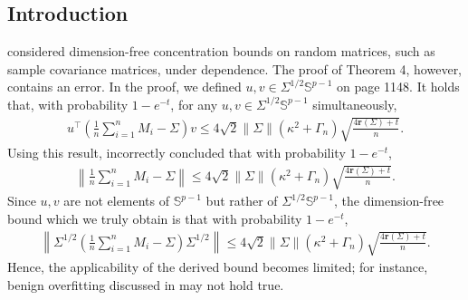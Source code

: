 \documentclass[11pt,a4paper]{article}
\theoremstyle{remark}
\theoremstyle{definition}
\newcommand{\bSigma}{\Sigma}
\newcommand{\bbS}{\mathbb{S}}
\newcommand{\er}{\mathbf{r}}
\theoremstyle{definition}
\begin{document}
\begin{bibunit}[apalike]

\begin{abstract}
We correct Theorem 4 of \citet{nakakita2024dimension} by introducing a log-Sobolev inequality in place of the the boundedness condition.
We show that the examples discussed in \citet{nakakita2024dimension} can be recovered under new conditions.
The original, uncorrected version---which includes the aforementioned error---is appended after this corrigendum for transparency and comparison.
\end{abstract}

\section{Introduction}
\citet{nakakita2024dimension} considered dimension-free concentration bounds on random matrices, such as sample covariance matrices, under dependence.
The proof of Theorem 4, however, contains an error.
In the proof,
we defined $u,v\in\Sigma^{1/2}\mathbb{S}^{p-1}$ on page 1148.
It holds
that, with probability $1-e^{-t}$, for any \underline{$u,v\in\Sigma^{1/2}\bbS^{p-1}$} simultaneously,
\begin{align*}
        u^{\top}\left(\frac{1}{n}\sum_{i=1}^{n}M_{i}-\Sigma\right)v\le 4\sqrt{2} \|\Sigma\|(\kappa^{2}+\Gamma_{n})\sqrt{\frac{4\er(\Sigma) + t}{n}}.
    \end{align*}
Using this result, \citet{nakakita2024dimension} incorrectly concluded that with probability $1-e^{-t}$,
    \begin{align*}
        \left\|\frac{1}{n}\sum_{i=1}^{n}M_{i}-\Sigma\right\|\le 4\sqrt{2} \|\Sigma\|(\kappa^{2}+\Gamma_{n})\sqrt{\frac{4\er(\Sigma) + t}{n}}.
    \end{align*}
    Since $u,v$ are not elements of $\bbS^{p-1}$ but rather of $\bSigma^{1/2}\bbS^{p-1}$, the dimension-free bound which we truly obtain is that with probability $1-e^{-t}$,
    \begin{align*}
        \left\|\Sigma^{1/2}\left(\frac{1}{n}\sum_{i=1}^{n}M_{i}-\Sigma\right)\Sigma^{1/2}\right\|\le 4\sqrt{2} \|\Sigma\|(\kappa^{2}+\Gamma_{n})\sqrt{\frac{4\er(\Sigma) + t}{n}}.
    \end{align*}
Hence, the applicability of the derived bound becomes limited; for instance, benign overfitting discussed in \citet{nakakita2024dimension} may not hold true.


\end{bibunit}
\end{document}
